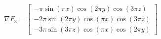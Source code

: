 $$
\nabla F_3 = \left[\begin{matrix}- \pi \sin{\left(\pi x \right)} \cos{\left(2 \pi y \right)} \cos{\left(3 \pi z \right)}\\- 2 \pi \sin{\left(2 \pi y \right)} \cos{\left(\pi x \right)} \cos{\left(3 \pi z \right)}\\- 3 \pi \sin{\left(3 \pi z \right)} \cos{\left(\pi x \right)} \cos{\left(2 \pi y \right)}\end{matrix}\right]
$$

